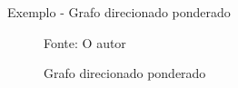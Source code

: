 \begin{frame}{Exemplo - Grafo direcionado ponderado}
    \begin{figure}[htbp]
        \centering
        
        \caption[Grafo Direcionado Ponderado]{Grafo direcionado ponderado}
        \small{Fonte: O autor}
        \label{fig:Grafo2}
    \end{figure}
\end{frame}